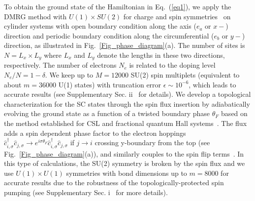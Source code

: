 \documentclass[aps,prx,reprint,superscriptaddress,showpacs]{revtex4-2}
\begin{document}
To obtain the ground state of the Hamiltonian in Eq.~(\ref{eq1}), we apply the  DMRG method with $U(1)\times SU(2)$ for charge and spin symmetries~\cite{McCulloch2007} on cylinder systems with open boundary condition along the axis ($e_{a}$ or $x-$) direction and periodic boundary condition along the circumferential ($e_{b}$ or $y-$)  direction, as illustrated in Fig.~\ref{Fig_phase_diagram}(a). The number of sites is $N=L_{x}\times L_{y}$ where  $L_{x}$ and $L_{y}$ denote the lengths in these two directions, respectively. 
The number of electrons $N_{e}$ is related to the doping level $N_{e}/N=1-\delta$.
We keep up to $M=12000$ SU(2) spin multiplets (equivalent to about $m=36000$ U(1) states) with  truncation error  $\epsilon \sim  10^{-6}$, which leads to  accurate results (see Supplementary Sec. ii~\cite{SuppMaterial} for details). We develop a topological characterization for the SC  states through the spin flux insertion by adiabatically evolving the ground state as a function of a twisted boundary phase $\theta_F$ based on the method established for CSL and fractional quantum Hall systems~\cite{gong2014,grushin2015characterization}. The flux adds a spin dependent phase factor to the electron hoppings $\widehat{c}_{i,\sigma}^{\dagger }\widehat{c}_{j,\sigma}\rightarrow e^{i\sigma\theta_{F}}\widehat{c}_{i,\sigma}^{\dagger}\widehat{c}_{j,\sigma}$ if $j\rightarrow i$ crossing y-boundary from the top (see Fig.~\ref{Fig_phase_diagram}(a)), and similarly couples to  the spin flip terms~\cite{gong2014}. In this type of calculations, the SU(2) symmetry is broken by the spin flux and we use $U(1)\times U(1)$ symmetries with bond dimensions up to $m=8000$ for accurate results due to the robustness of the topologically-protected spin pumping (see Supplementary Sec. i~\cite{SuppMaterial} for more details).




\end{document}

